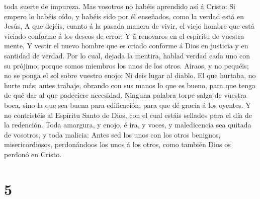 toda suerte de impureza.  Mas vosotros no habéis aprendido
así á Cristo:  Si empero lo habéis oído, y habéis sido por
él enseñados, como la verdad está en Jesús,  A que dejéis,
cuanto á la pasada manera de vivir, el viejo hombre que está viciado
conforme á los deseos de error;  Y á renovaros en el
espíritu de vuestra mente,  Y vestir el nuevo hombre que es
criado conforme á Dios en justicia y en santidad de verdad.
 Por lo cual, dejada la mentira, hablad verdad cada uno con
su prójimo; porque somos miembros los unos de los otros. 
Airaos, y no pequéis; no se ponga el sol sobre vuestro enojo;
 Ni deis lugar al diablo.  El que hurtaba, no
hurte más; antes trabaje, obrando con sus manos lo que es bueno, para
que tenga de qué dar al que padeciere necesidad.  Ninguna
palabra torpe salga de vuestra boca, sino la que sea buena para
edificación, para que dé gracia á los oyentes.  Y no
contristéis al Espíritu Santo de Dios, con el cual estáis sellados para
el día de la redención.  Toda amargura, y enojo, é ira, y
voces, y maledicencia sea quitada de vosotros, y toda malicia:
 Antes sed los unos con los otros benignos,
misericordiosos, perdonándoos los unos á los otros, como también Dios os
perdonó en Cristo.

\hypertarget{section-4}{%
\section{5}\label{section-4}}

